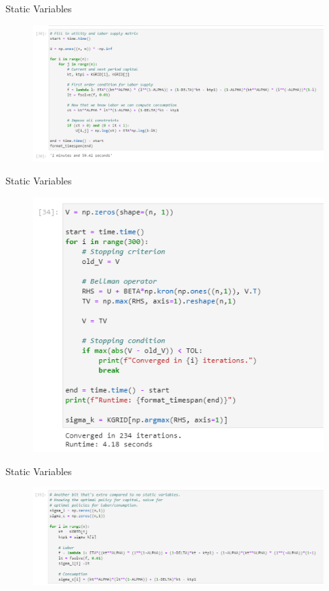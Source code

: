 \documentclass[11pt, xcolor={dvipsnames}, hyperref={colorlinks, allcolors=Blue}]{beamer}
\begin{document}
\begin{frame}{Static Variables}

\begin{figure}
	\includegraphics[width=\textwidth]{Code8.png}
	\hfill
\end{figure}

\end{frame}
\begin{frame}{Static Variables}

\begin{figure}
	\includegraphics[height=0.8\paperheight]{Code9.png}
	\hfill
\end{figure}

\end{frame}
\begin{frame}{Static Variables}

\begin{figure}
	\includegraphics[width=\textwidth]{Code10.png}
	\hfill
\end{figure}
\end{frame}
\end{document}
